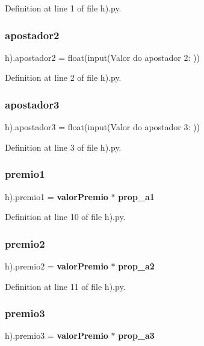 Definition at line 1 of file h).\+py.

\mbox{\label{namespaceh_08_ac18364f5c150938bf4b16a5f9209643a}} 
\subsubsection{apostador2}
{\footnotesize\ttfamily h).apostador2 = float(input(\textquotesingle{}Valor do apostador 2\+: \textquotesingle{}))}



Definition at line 2 of file h).\+py.

\mbox{\label{namespaceh_08_ad3cb89b0e6d3d7f3907399bd995f0a31}} 
\subsubsection{apostador3}
{\footnotesize\ttfamily h).apostador3 = float(input(\textquotesingle{}Valor do apostador 3\+: \textquotesingle{}))}



Definition at line 3 of file h).\+py.

\mbox{\label{namespaceh_08_ab7a6525b6e81af154923fad9410b37a6}} 
\subsubsection{premio1}
{\footnotesize\ttfamily h).premio1 = \textbf{ valor\+Premio} $\ast$ \textbf{ prop\+\_\+a1}}



Definition at line 10 of file h).\+py.

\mbox{\label{namespaceh_08_a1ea9ead6c7d67abe5e4e4687e51d356b}} 
\subsubsection{premio2}
{\footnotesize\ttfamily h).premio2 = \textbf{ valor\+Premio} $\ast$ \textbf{ prop\+\_\+a2}}



Definition at line 11 of file h).\+py.

\mbox{\label{namespaceh_08_ad810a7abbc6402abe8470436cd24854e}} 
\subsubsection{premio3}
{\footnotesize\ttfamily h).premio3 = \textbf{ valor\+Premio} $\ast$ \textbf{ prop\+\_\+a3}}



